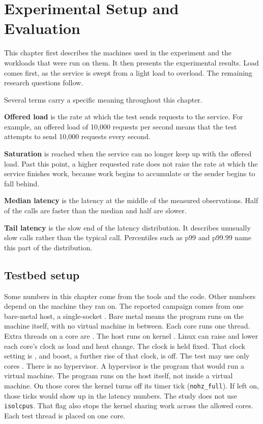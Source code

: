 \documentclass[english,oneside,a4paper,censored,csm,software-track-2020]{HYthesisML}
\begin{document}
\chapter{Experimental Setup and Evaluation\label{chapter:eval}}

This chapter first describes the machines used in the experiment and 
the workloads that were run on them. It then presents the experimental results. 
Load comes first, as the service is swept from a light load to
overload. The remaining research questions follow.


Several terms carry a specific meaning throughout this chapter.

\textbf{Offered load} is the rate at which the test sends requests to the
service. For example, an offered load of 10{,}000 requests per second means
that the test attempts to send 10{,}000 requests every second.

\textbf{Saturation} is reached when the service can no longer keep up with the
offered load. Past this point, a higher requested rate does not raise the rate
at which the service finishes work, because work begins to accumulate or the
sender begins to fall behind.

\textbf{Median latency} is the latency at the middle of the measured
observations. Half of the calls are faster than the median and half are slower.

\textbf{Tail latency} is the slow end of the latency distribution. It
describes unusually slow calls rather than the typical call. Percentiles such
as p99 and p99.99 name this part of the distribution.

\section{Testbed setup\label{sec:testbed}}
Some numbers in this chapter come from the tools and the code. Other
numbers depend on the machine they ran on. The reported campaign comes from
one bare-metal host, a single-socket \MainCpu{}. Bare metal means the program runs on the machine itself,
with no virtual machine in between. Each core runs one
thread. Extra threads on a core are \MainSmt{}. The host runs
\MainHostDistro{} on kernel \MainKernel{}. Linux can raise and
lower each core's clock as load and heat change. The clock is held
fixed. That clock setting is \MainGovernor{}, and boost, a further rise of that clock, is off. The
test may use only cores \MainPinned{}. There is no hypervisor. A hypervisor
is the program that would run a virtual machine. The
program runs on the host itself, not inside a virtual machine. On those
cores the kernel turns off its timer tick (\texttt{nohz\_full}).
If left on, those ticks would show up in the latency numbers. The study does
not use \texttt{isolcpus}. That flag also stops the kernel sharing work
across the allowed cores. Each test thread is placed on
one core.
\end{document}
